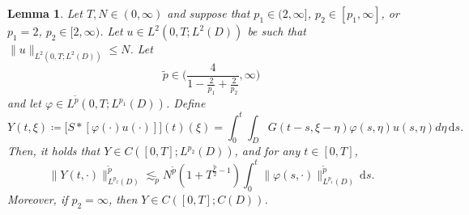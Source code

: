 \documentclass{amsart}
\theoremstyle{plain}
\theoremstyle{remark}
\theoremstyle{plain}
\newtheorem{lemma}[theorem]{Lemma}
\numberwithin{equation}{section}
\newcommand{\ceqq}{\coloneqq}
\newcommand{\dd}{\,\mathrm{d}}
\begin{document}
\begin{lemma} 
\label{lem:det conv}
Let $T,N\in(0,\infty)$  and suppose that  
$p_1\in(2,\infty]$, $p_2\in[p_1,\infty]$, or  $p_1=2$,  $p_2 \in [2,\infty)$.   
Let $u\in L^2(0,T;L^2(D))$ be such that $\|u\|_{L^2(0,T;L^2(D))}\leq N$. Let 
\begin{equation}\label{eq:cond tilde p}
    \tilde p\in\Big(\frac{4}{1-\frac{2}{p_1}+\frac{2}{p_2}},\infty\Big)
\end{equation}
and let $\varphi\in L^{\tilde p}(0,T;L^{p_1}(D))$. 
Define 
\[
Y(t,\xi)\ceqq \big[S*[\varphi(\cdot)u(\cdot)]\big](t)(\xi)=\int_0^t \int_{D} G(t-s,\xi-\eta)\varphi(s,\eta)u(s,\eta)d\eta \dd s.\]
Then, it holds that $Y\in C([0,T];L^{p_2}(D))$,   and for any   $t\in [0,T]$,
\[
\|Y(t,\cdot)\|_{L^{p_2}(D)}^{\tilde p}  \lesssim_{{\tilde p}} N^{{\tilde p}}(1+T^{\frac{\tilde p}{2}-1})\int_0^t\|\varphi(s,\cdot)\|_{L^{p_1}(D)}^{{\tilde p}}\dd s.
\]
Moreover, if $p_2=\infty$, then $Y\in C([0,T];C(D))$. 
\end{lemma}  
\end{document}
